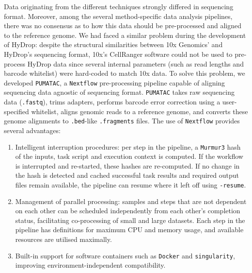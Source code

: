 Data originating from the different techniques strongly differed in sequencing format. Moreover, among the several method-specific data analysis pipelines, there was no consensus as to how this data should be pre-processed and aligned to the reference genome. We had faced a similar problem during the development of HyDrop: despite the structural similarities between 10x Genomics' and HyDrop's sequencing format, 10x's CellRanger software could not be used to pre-process HyDrop data since several internal parameters (such as read lengths and barcode whitelist) were hard-coded to match 10x data. To solve this problem, we developed \verb|PUMATAC|, a \verb|Nextflow| pre-processing pipeline capable of aligning sequencing data agnostic of sequencing format. \verb|PUMATAC| takes raw sequencing data (\verb|.fastq|), trims adapters, performs barcode error correction using a user-specified whitelist, aligns genomic reads to a reference genome, and converts these genome alignments to \verb|.bed|-like \verb|.fragments| files. The use of \verb|Nextflow| provides several advantages:

\begin{enumerate}[noitemsep]
	\item Intelligent interruption procedures: per step in the pipeline, a \verb|Murmur3| hash of the inputs, task script and execution context is computed. If the workflow is interrupted and re-started, these hashes are re-computed. If no change in the hash is detected and cached successful task results and required output files remain available, the pipeline can resume where it left off using \verb|-resume|.
	\item Management of parallel processing: samples and steps that are not dependent on each other can be scheduled independently from each other's completion status, facilitating co-processing of small and large datasets. Each step in the pipeline has definitions for maximum CPU and memory usage, and available resources are utilised maximally.
	\item Built-in support for software containers such as \verb|Docker| and \verb|singularity|, improving environment-independent compatibility.
\end{enumerate}

